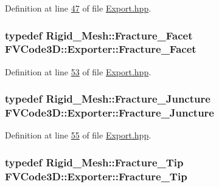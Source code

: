 Definition at line \hyperlink{Export_8hpp_source_l00047}{47} of file \hyperlink{Export_8hpp_source}{Export.\+hpp}.

\subsubsection[{\texorpdfstring{Fracture\+\_\+\+Facet}{Fracture_Facet}}]{\setlength{\rightskip}{0pt plus 5cm}typedef {\bf Rigid\+\_\+\+Mesh\+::\+Fracture\+\_\+\+Facet} {\bf F\+V\+Code3\+D\+::\+Exporter\+::\+Fracture\+\_\+\+Facet}}\hypertarget{classFVCode3D_1_1Exporter_ad213c5ad78040015b3e6dfb11fe015fe}{}\label{classFVCode3D_1_1Exporter_ad213c5ad78040015b3e6dfb11fe015fe}


Definition at line \hyperlink{Export_8hpp_source_l00053}{53} of file \hyperlink{Export_8hpp_source}{Export.\+hpp}.

\subsubsection[{\texorpdfstring{Fracture\+\_\+\+Juncture}{Fracture_Juncture}}]{\setlength{\rightskip}{0pt plus 5cm}typedef {\bf Rigid\+\_\+\+Mesh\+::\+Fracture\+\_\+\+Juncture} {\bf F\+V\+Code3\+D\+::\+Exporter\+::\+Fracture\+\_\+\+Juncture}}\hypertarget{classFVCode3D_1_1Exporter_a30344139bcff116e4b2b34dd829bac98}{}\label{classFVCode3D_1_1Exporter_a30344139bcff116e4b2b34dd829bac98}


Definition at line \hyperlink{Export_8hpp_source_l00055}{55} of file \hyperlink{Export_8hpp_source}{Export.\+hpp}.

\subsubsection[{\texorpdfstring{Fracture\+\_\+\+Tip}{Fracture_Tip}}]{\setlength{\rightskip}{0pt plus 5cm}typedef {\bf Rigid\+\_\+\+Mesh\+::\+Fracture\+\_\+\+Tip} {\bf F\+V\+Code3\+D\+::\+Exporter\+::\+Fracture\+\_\+\+Tip}}\hypertarget{classFVCode3D_1_1Exporter_a0b32ca80de98d8d633485ef5c0f537bb}{}\label{classFVCode3D_1_1Exporter_a0b32ca80de98d8d633485ef5c0f537bb}


